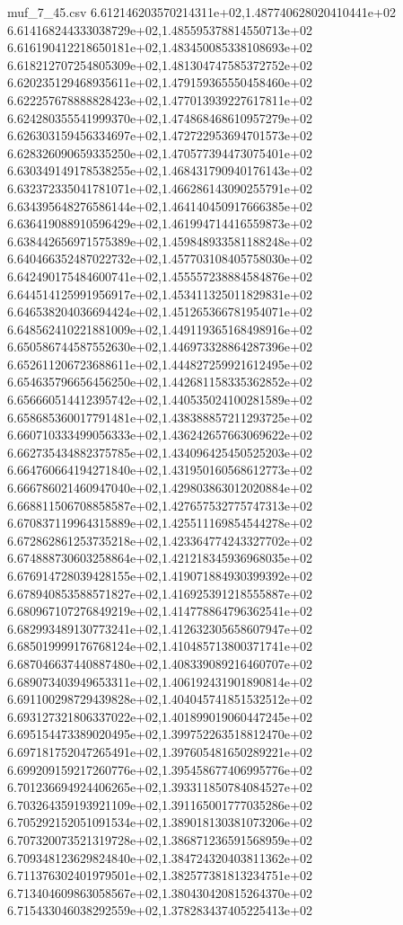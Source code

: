 \begin{filecontents*}{muf_7_45.csv}
6.612146203570214311e+02,1.487740628020410441e+02
6.614168244333038729e+02,1.485595378814550713e+02
6.616190412218650181e+02,1.483450085338108693e+02
6.618212707254805309e+02,1.481304747585372752e+02
6.620235129468935611e+02,1.479159365550458460e+02
6.622257678888828423e+02,1.477013939227617811e+02
6.624280355541999370e+02,1.474868468610957279e+02
6.626303159456334697e+02,1.472722953694701573e+02
6.628326090659335250e+02,1.470577394473075401e+02
6.630349149178538255e+02,1.468431790940176143e+02
6.632372335041781071e+02,1.466286143090255791e+02
6.634395648276586144e+02,1.464140450917666385e+02
6.636419088910596429e+02,1.461994714416559873e+02
6.638442656971575389e+02,1.459848933581188248e+02
6.640466352487022732e+02,1.457703108405758030e+02
6.642490175484600741e+02,1.455557238884584876e+02
6.644514125991956917e+02,1.453411325011829831e+02
6.646538204036694424e+02,1.451265366781954071e+02
6.648562410221881009e+02,1.449119365168498916e+02
6.650586744587552630e+02,1.446973328864287396e+02
6.652611206723688611e+02,1.444827259921612495e+02
6.654635796656456250e+02,1.442681158335362852e+02
6.656660514412395742e+02,1.440535024100281589e+02
6.658685360017791481e+02,1.438388857211293725e+02
6.660710333499056333e+02,1.436242657663069622e+02
6.662735434882375785e+02,1.434096425450525203e+02
6.664760664194271840e+02,1.431950160568612773e+02
6.666786021460947040e+02,1.429803863012020884e+02
6.668811506708858587e+02,1.427657532775747313e+02
6.670837119964315889e+02,1.425511169854544278e+02
6.672862861253735218e+02,1.423364774243327702e+02
6.674888730603258864e+02,1.421218345936968035e+02
6.676914728039428155e+02,1.419071884930399392e+02
6.678940853588571827e+02,1.416925391218555887e+02
6.680967107276849219e+02,1.414778864796362541e+02
6.682993489130773241e+02,1.412632305658607947e+02
6.685019999176768124e+02,1.410485713800371741e+02
6.687046637440887480e+02,1.408339089216460707e+02
6.689073403949653311e+02,1.406192431901890814e+02
6.691100298729439828e+02,1.404045741851532512e+02
6.693127321806337022e+02,1.401899019060447245e+02
6.695154473389020495e+02,1.399752263518812470e+02
6.697181752047265491e+02,1.397605481650289221e+02
6.699209159217260776e+02,1.395458677406995776e+02
6.701236694924406265e+02,1.393311850784084527e+02
6.703264359193921109e+02,1.391165001777035286e+02
6.705292152051091534e+02,1.389018130381073206e+02
6.707320073521319728e+02,1.386871236591568959e+02
6.709348123629824840e+02,1.384724320403811362e+02
6.711376302401979501e+02,1.382577381813234751e+02
6.713404609863058567e+02,1.380430420815264370e+02
6.715433046038292559e+02,1.378283437405225413e+02

\end{filecontents*}
